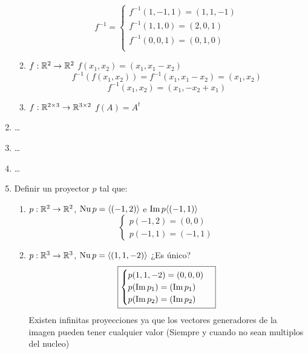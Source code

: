 \documentclass[../practica.root.tex]{subfiles}
\begin{document}
\begin{enumerate}
\begin{enumerate}
                    \[
                        \boxed{
                            f^{-1} =
                            \begin{cases}
                                f^{-1}(1,-1,1) = (1,1,-1) \\
                                f^{-1}(1,1,0) = (2,0,1)   \\
                                f^{-1}(0,0,1) = (0,1,0)   \\
                            \end{cases}
                        }
                    \]
              \item \( f : \mathbb{R}^2 \to \mathbb{R}^2 \) \( f(x_1,x_2) = (x_1,x_1-x_2) \)
                    \[ f^{-1}(f(x_1,x_2)) = f^{-1}(x_1, x_1 - x_2) = (x_1, x_2) \]
                    \[ \boxed{f^{-1}(x_1, x_2) = (x_1, -x_2 + x_1) } \]
              \item \( f : \mathbb{R}^{2\times3} \to \mathbb{R}^{3\times2} \) \( f(A) = A^t \)
          \end{enumerate}
    \item \dots
    \item \dots
    \item \dots
    \item Definir un proyector $p$ tal que:
          \begin{enumerate}
              \item \( p : \mathbb{R}^2 \to \mathbb{R}^2 \), \( \operatorname{Nu} p = \langle (-1,2) \rangle \) e \( \operatorname{Im} p \langle (-1,1) \rangle \)
                    \[
                        \boxed{
                            \begin{cases}
                                p(-1,2) = (0,0) \\
                                p(-1,1) = (-1,1)
                            \end{cases}
                        }
                    \]
              \item \( p : \mathbb{R}^3 \to \mathbb{R}^3 \), \( \operatorname{Nu} p = \langle (1,1,-2) \rangle \) ¿Es único?
                    \[
                        \boxed{
                            \begin{cases}
                                p(1,1,-2) = (0,0,0)      \\
                                p(\operatorname{Im} p_1) = (\operatorname{Im} p_1) \\
                                p(\operatorname{Im} p_2) = (\operatorname{Im} p_2)
                            \end{cases}
                        }
                    \]
                    Existen infinitas proyecciones ya que los vectores generadores de la imagen pueden tener cualquier valor (Siempre y cuando no sean multiplos del nucleo)

\end{enumerate}
\end{enumerate}
\end{document}

